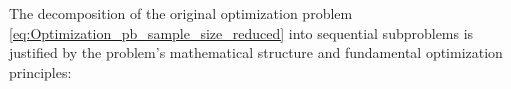 




The decomposition of the original optimization problem \eqref{eq:Optimization_pb_sample_size_reduced} into sequential subproblems is justified by the problem's mathematical structure and fundamental optimization principles:


